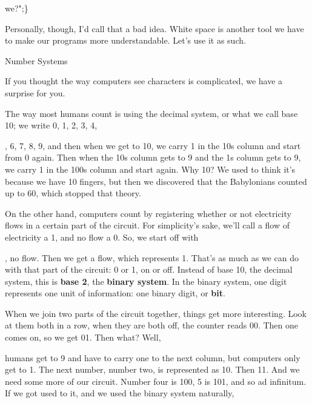\documentclass[a4paper,11pt]{book}
\begin{document}
\noindent we?";\}

\noindent 

\noindent Personally, though, I'd call that a bad idea. White space is another tool we have to make our programs more understandable. Let's use it as such.

\noindent 

\noindent 

\noindent Number Systems

\noindent 

\noindent If you thought the way computers see characters is complicated, we have a surprise for you.

\noindent 

\noindent The way most humans count is using the decimal system, or what we call base 10; we write 0, 1, 2, 3, 4,

, 6, 7, 8, 9, and then when we get to 10, we carry 1 in the 10s column and start from 0 again. Then when the 10s column gets to 9 and the 1s column gets to 9, we carry 1 in the 100s column and start again. Why 10? We used to think it's because we have 10 fingers, but then we discovered that the Babylonians counted up to 60, which stopped that theory.

\noindent 

\noindent On the other hand, computers count by registering whether or not electricity flows in a certain part of the circuit. For simplicity's sake, we'll call a flow of electricity a 1, and no flow a 0. So, we start off with

, no flow. Then we get a flow, which represents 1. That's as much as we can do with that part of the circuit: 0 or 1, on or off. Instead of base 10, the decimal system, this is \textbf{base 2}, the \textbf{binary system}. In the binary system, one digit represents one unit of information: one binary digit, or \textbf{bit}.

\noindent 

\noindent When we join two parts of the circuit together, things get more interesting. Look at them both in a row, when they are both off, the counter reads 00. Then one comes on, so we get 01. Then what? Well,

\noindent humans get to 9 and have to carry one to the next column, but computers only get to 1. The next number, number two, is represented as 10. Then 11. And we need some more of our circuit. Number four is 100, 5 is 101, and so ad infinitum. If we got used to it, and we used the binary system naturally,
\end{document}
